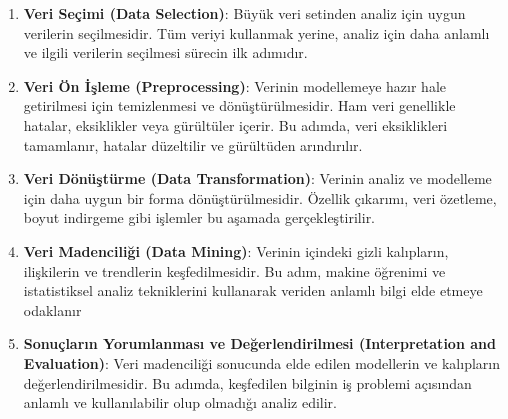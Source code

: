 \begin{enumerate}
    \item \textbf{Veri Seçimi (Data Selection)}: Büyük veri setinden analiz için uygun verilerin seçilmesidir. Tüm veriyi kullanmak yerine, analiz için daha anlamlı ve ilgili verilerin seçilmesi sürecin ilk adımıdır.
    \item \textbf{Veri Ön İşleme (Preprocessing)}: Verinin modellemeye hazır hale getirilmesi için temizlenmesi ve dönüştürülmesidir. Ham veri genellikle hatalar, eksiklikler veya gürültüler içerir. Bu adımda, veri eksiklikleri tamamlanır, hatalar düzeltilir ve gürültüden arındırılır.
    \item \textbf{Veri Dönüştürme (Data Transformation)}: Verinin analiz ve modelleme için daha uygun bir forma dönüştürülmesidir. Özellik çıkarımı, veri özetleme, boyut indirgeme gibi işlemler bu aşamada gerçekleştirilir.
    \item \textbf{Veri Madenciliği (Data Mining)}: Verinin içindeki gizli kalıpların, ilişkilerin ve trendlerin keşfedilmesidir. Bu adım, makine öğrenimi ve istatistiksel analiz tekniklerini kullanarak veriden anlamlı bilgi elde etmeye odaklanır
    \item \textbf{Sonuçların Yorumlanması ve Değerlendirilmesi (Interpretation and Evaluation)}: Veri madenciliği sonucunda elde edilen modellerin ve kalıpların değerlendirilmesidir. Bu adımda, keşfedilen bilginin iş problemi açısından anlamlı ve kullanılabilir olup olmadığı analiz edilir.
\end{enumerate}

\newpage